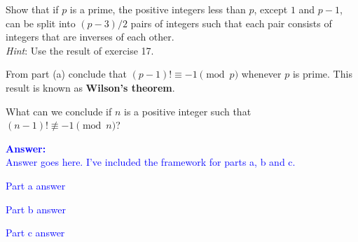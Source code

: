 \item{}
\begin{list}{\textbf{.}}{}
\item Show that if $p$ is a prime, the positive integers less than $p$, except
$1$ and $p-1$, can be split into $(p-3)/2$ pairs of integers such that each pair
consists of integers that are inverses of each other.\\
\emph{Hint}\/: Use the result of exercise 17.
\item From part (a) conclude that $(p-1)!\equiv-1\pmod p$ whenever $p$ is
prime. This result is known as {\bf Wilson's theorem}.
\item What can we conclude if $n$ is a positive integer such that $(n-1)!
\not\equiv-1\pmod n$?
\end{list}
\vskip12pt
\ifanswers
\textcolor{blue}{
\textbf{Answer:}\\[6pt]
Answer goes here. I've included the framework for parts a, b and c.
\begin{list}{\textbf{.}}{}
\item Part a answer
\item Part b answer
\item Part c answer
\end{list}
}
\newpage
\fi
